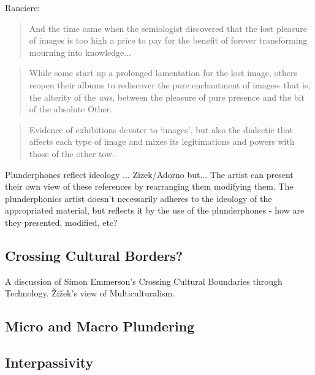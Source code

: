 Ranciere: 
\begin{quote}
And the time came when the semiologist discovered that the lost pleasure of images is too high a price to pay for the benefit of forever transforming mourning into knowledge... 
\end{quote}
\begin{quote}
While some start up a prolonged lamentation for the lost image, others reopen their albums to rediscover the pure enchantment of images- that is, the alterity of the \emph{was}, between the pleasure of pure presence and the bit of the absolute Other.
\end{quote}
\begin{quote}
Evidence of exhibitions devoter to `images', but also the dialectic that affects each type of image and mixes its legitimations and powers with those of the other tow.
\end{quote}
Plunderphones reflect ideology ... Zizek/Adorno but... The artist can present their own view of these references by rearranging them modifying them. The plunderphonics artist doesn't necessarily adheres to the ideology of the appropriated material, but reflects it by the use of the plunderphones - how are they presented, modified, etc?  

\subsection{Crossing Cultural Borders?}

A discussion of Simon Emmerson's Crossing Cultural Boundaries through Technology. 
\v{Z}i\v{z}ek's view of Multiculturalism. 

\subsection{Micro and Macro Plundering}

\subsection{Interpassivity}


\label{ch:introduction}
